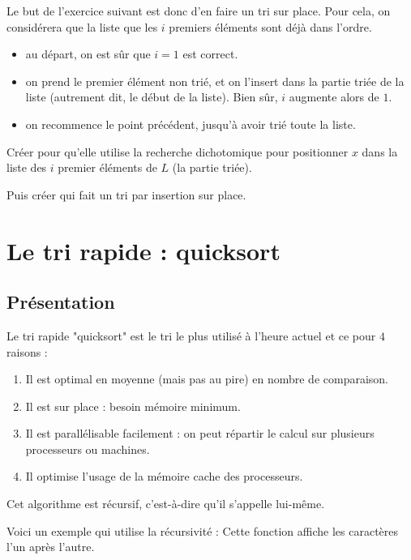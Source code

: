 \documentclass[french,12pt,twoside]{VcCours}
\begin{document}
Le but de l'exercice suivant est donc d'en faire un tri sur place. Pour cela, on 
considérera que la liste  que les $i$ premiers éléments sont déjà dans 
l'ordre.
\begin{itemize}\renewcommand{\labelitemi}{\textbullet}
  \item au départ, on est sûr que $i=1$ est correct.
  \item on prend le premier élément non trié, et on l'insert dans la partie 
  triée de la liste (autrement dit, le début de la liste). Bien sûr, $i$ 
  augmente alors de $1$.
  \item on recommence le point précédent, jusqu'à avoir trié toute la liste.
\end{itemize}


\begin{Exercice}
Créer  pour qu'elle utilise la recherche 
dichotomique pour positionner $x$ dans la liste des $i$ premier éléments de $L$ 
(la partie triée).

Puis créer  qui fait un tri par insertion sur place.
\end{Exercice}


\newpage
\section{Le tri rapide : quicksort}
\subsection{Présentation}
Le tri rapide "quicksort" est le tri le plus utilisé à l'heure actuel et ce pour 
$4$ raisons :
\begin{enumerate}
  \item Il est optimal en moyenne (mais pas au pire) en nombre de comparaison.
  \item Il est sur place : besoin mémoire minimum.
  \item Il est parallélisable facilement : on peut répartir le calcul sur 
  plusieurs processeurs ou machines.
  \item Il optimise l'usage de la mémoire cache des processeurs.
\end{enumerate}

Cet algorithme est récursif, c'est-à-dire qu'il s'appelle lui-même.

Voici un exemple qui utilise la récursivité : Cette fonction 
affiche les caractères l'un après l'autre.
\end{document}
